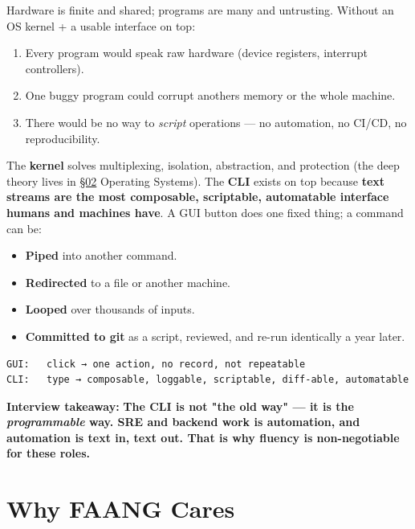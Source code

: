 \documentclass[11pt]{article}
\providecommand{\tightlist}{\setlength{\itemsep}{1pt}\setlength{\parskip}{0pt}}
\begin{document}
Hardware is finite and shared; programs are many and untrusting. Without an OS kernel + a usable interface on top:

\begin{enumerate}
\def\labelenumi{\arabic{enumi}.}
\tightlist
\item
  Every program would speak raw hardware (device registers, interrupt controllers).
\item
  One buggy program could corrupt another\textquotesingle s memory or the whole machine.
\item
  There would be no way to \emph{script} operations --- no automation, no CI/CD, no reproducibility.
\end{enumerate}

The \textbf{kernel} solves multiplexing, isolation, abstraction, and protection (the deep theory lives in \hyperlink{section.02}{\textcolor{acc}{§02}} Operating Systems). The \textbf{CLI} exists on top because \textbf{text streams are the most composable, scriptable, automatable interface humans and machines have}. A GUI button does one fixed thing; a command can be:

\begin{itemize}
\tightlist
\item
  \textbf{Piped} into another command.
\item
  \textbf{Redirected} to a file or another machine.
\item
  \textbf{Looped} over thousands of inputs.
\item
  \textbf{Committed to git} as a script, reviewed, and re-run identically a year later.
\end{itemize}

\setcodelang{}

\begin{verbatim}
GUI:   click → one action, no record, not repeatable
CLI:   type → composable, loggable, scriptable, diff-able, automatable
\end{verbatim}

\textbf{Interview takeaway:} \textbf{The CLI is not "the old way" --- it is the \emph{programmable} way. SRE and backend work is automation, and automation is text in, text out. That is why fluency is non-negotiable for these roles.}

\section{Why FAANG Cares}\label{why-faang-cares}
\end{document}
